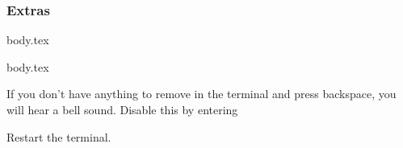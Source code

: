 \subsubsection{Extras}

\ifdefined\wslTerminalPath
{body.tex}
\fi

\ifdefined\wslDirectoryHighlight
{body.tex}
\fi


If you don't have anything to remove in the terminal and press backspace, you will hear a bell sound. Disable this by entering


Restart the terminal.